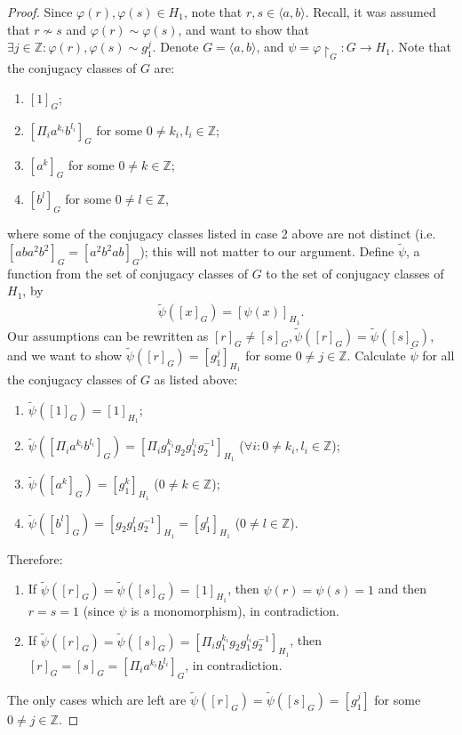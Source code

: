\documentclass[11pt]{article}
\newenvironment{myequation}
    {
        \begin{equation*}
        \begin{gathered}
    }
    { 
        \end{gathered} 
        \end{equation*}
    }
\newcommand{\Z}{\mathbb{Z}}
\begin{document}
\begin{proof}
        Since $\varphi(r),\varphi(s) \in H_1$, note that $r,s \in \langle a,b \rangle$. Recall, it was assumed that $r \not\sim s$ and $\varphi(r) \sim \varphi(s)$, and want to show that $\exists j \in \Z: \varphi(r), \varphi(s) \sim g_1^j$.
        Denote $G = \langle a,b \rangle$, and $\psi = \varphi \restriction_G : G \to H_1$. Note that the conjugacy classes of $G$ are:
        \begin{enumerate}
            \item $[1]_G$;
            \item $[\Pi_i a^{k_i}b^{l_i}]_G$ for some $0 \neq k_i,l_i \in \Z$;
            \item $[a^k]_G$ for some $0 \neq k \in \Z$;
            \item $[b^l]_G$ for some $0 \neq l \in \Z$,
        \end{enumerate}
        where some of the conjugacy classes listed in case 2 above are not distinct (i.e. $[aba^2b^2]_G = [a^2b^2ab]_G$); this will not matter to our argument. Define $\tilde{\psi}$, a function from the set of conjugacy classes of $G$ to the set of conjugacy classes of $H_1$, by
        \begin{myequation}
            \tilde{\psi}([x]_G) = [\psi(x)]_{H_1} .
        \end{myequation}
        Our assumptions can be rewritten as $[r]_G \neq [s]_G, \tilde{\psi}([r]_G) = \tilde{\psi}([s]_G)$, and we want to show $\tilde{\psi}([r]_G) = [g_1^j]_{H_1}$ for some $0 \neq j \in \Z$. Calculate $\tilde{\psi}$ for all the conjugacy classes of $G$ as listed above:
        \begin{enumerate}
            \item $\tilde{\psi}([1]_G) = [1]_{H_1}$;
            \item $\tilde{\psi}([\Pi_i a^{k_i}b^{l_i}]_G) = [\Pi_i g_1^{k_i} g_2 g_1^{l_i} g_2^{-1}]_{H_1}$ ($\forall i: 0 \neq k_i,l_i \in \Z$);
            \item $\tilde{\psi}([a^k]_G) = [g_1^k]_{H_1}$ ($0 \neq k \in \Z$);
            \item $\tilde{\psi}([b^l]_G) = [g_2 g_1^l g_2^{-1}]_{H_1} = [g_1^l]_{H_1}$ ($0 \neq l \in \Z$).
        \end{enumerate}
        
        Therefore:
        \begin{enumerate}
            \item If $\tilde{\psi}([r]_G) = \tilde{\psi}([s]_G) = [1]_{H_1}$, then $\psi(r) = \psi(s) = 1$ and then $r = s = 1$ (since $\psi$ is a monomorphism), in contradiction.
            \item If $\tilde{\psi}([r]_G) = \tilde{\psi}([s]_G) = [\Pi_i g_1^{k_i} g_2 g_1^{l_i} g_2^{-1}]_{H_1}$, then $[r]_G = [s]_G = [\Pi_i a^{k_i}b^{l_i}]_G$, in contradiction.
        \end{enumerate}
        
        The only cases which are left are $\tilde{\psi}([r]_G) = \tilde{\psi}([s]_G) = [g_1^j]$ for some $0 \neq j \in \Z$.
    \end{proof}
    
\end{document}
